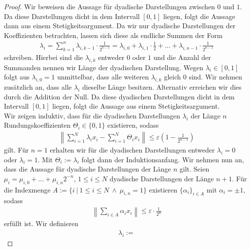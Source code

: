 \begin{proof}
	Wir beweisen die Aussage für dyadische Darstellungen zwischen $ 0 $ und $ 1 $.
	Da diese Darstellungen dicht in dem Intervall $ [0,1] $ liegen, folgt die Aussage dann aus einem Stetigkeitsargument.
	Da wir nur dyadische Darstellungen der Koeffizienten betrachten, lassen sich diese als endliche Summen der Form 
	\begin{align}\label{eq:dyadic_rep}
		\lambda_i =
		\sum \limits_{k = 1}^n
		\lambda_{i,k-1}
		\cdot \frac{1}{2^{k-1}}
		=
		\lambda_{i,0}
		+
		\lambda_{i,1} \cdot \frac{1}{2}
		+
		...
		+
		\lambda_{i,n-1} \cdot \frac{1}{2^{n-1}}
	\end{align}
	schreiben. Hierbei sind die $ \lambda_{i,k} $ entweder $ 0 $ oder $ 1 $ und die Anzahl der Summanden nennen wir Länge der dyadischen Darstellung.
	Wegen $ \lambda_{i} \in [0,1] $ folgt aus $ \lambda_{i,0} = 1 $ unmittelbar, dass alle weiteren $ \lambda_{i,k} $ gleich $ 0 $ sind.
	Wir nehmen zusätzlich an, dass alle $ \lambda_{i} $ dieselbe Länge besitzen. 
	Alternativ erreichen wir dies durch die Addition der Null.
	Da diese dyadischen Darstellungen dicht in dem Intervall $ [0,1] $ liegen, folgt die Aussage aus einem Stetigkeitsargument.\\
	Wir zeigen induktiv, dass für die dyadischen Darstellungen $ \lambda_{i} $ der Länge $ n $ Rundungskoeffizienten $ \Theta_i \in \{0,1\} $ existieren, sodass
	\begin{align}\label{eq:induction_inequaltiy}
		\left\|
		\sum \limits_{i = 1}^N
		\lambda_i x_i
		-
		\sum \limits_{i = 1}^N
		\Theta_i x_i
		\right\|
		\leq \varepsilon 
		\left( 1 - \frac{1}{2^{n-1}} \right)
	\end{align}
	gilt. 
	Für $ n = 1 $ erhalten wir für die dyadischen Darstellungen entweder $ \lambda_i = 0 $ oder $ \lambda_{i} = 1 $. Mit $ \Theta_i := \lambda_{i}  $ folgt dann der Induktionsanfang.
	Wir nehmen nun an, dass die Aussage für dyadische Darstellungen der Länge $ n $ gilt.
	Seien $ \mu_i = \mu_{i,0}+ ... + \mu_{i,n} 2^{-n} $, $ 1 \leq i \leq N $ dyadische Darstellungen der Länge $ n +1 $.
	Für die Indexmenge $ A := \{ i \ | \ 1 \leq  i \leq N \ \wedge \ \mu_{i,n} = 1 \} $ existieren $ \{ \alpha_i \}_{i \in A} $ mit $ \alpha_i = \pm 1 $, sodass
	\begin{align*}
		\left\| \sum \limits_{i \in A} \alpha_i x_i \right\| \leq \varepsilon \cdot \frac{1}{2^n}
	\end{align*}
	erfüllt ist. Wir definieren 
	\begin{align*}
		\lambda_{i} 
		:= 

\end{align*}
\end{proof}
